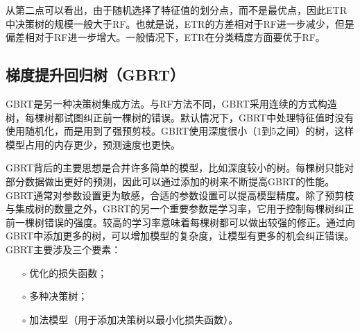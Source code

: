 从第二点可以看出，由于随机选择了特征值的划分点，而不是最优点，因此ETR中决策树的规模一般大于RF。也就是说，ETR的方差相对于RF进一步减少，但是偏差相对于RF进一步增大。一般情况下，ETR在分类精度方面要优于RF。

\subsection{梯度提升回归树（GBRT）}\label{sec:ml_gbr}

GBRT是另一种决策树集成方法。与RF方法不同，GBRT采用连续的方式构造树，每棵树都试图纠正前一棵树的错误。默认情况下，GBRT中处理特征值时没有使用随机化，而是用到了强预剪枝。GBRT使用深度很小（1到5之间）的树，这样模型占用的内存更少，预测速度也更快。

GBRT背后的主要思想是合并许多简单的模型，比如深度较小的树。每棵树只能对部分数据做出更好的预测，因此可以通过添加的树来不断提高GBRT的性能。GBRT通常对参数设置更为敏感，合适的参数设置可以提高模型精度。除了预剪枝与集成树的数量之外，GBRT的另一个重要参数是学习率，它用于控制每棵树纠正前一棵树错误的强度。较高的学习率意味着每棵树都可以做出较强的修正。通过向GBRT中添加更多的树，可以增加模型的复杂度，让模型有更多的机会纠正错误。GBRT主要涉及三个要素：
\begin{itemize}
  \item[$\circ$] 优化的损失函数；
  \item[$\circ$] 多种决策树；
  \item[$\circ$] 加法模型（用于添加决策树以最小化损失函数）。
\end{itemize}



